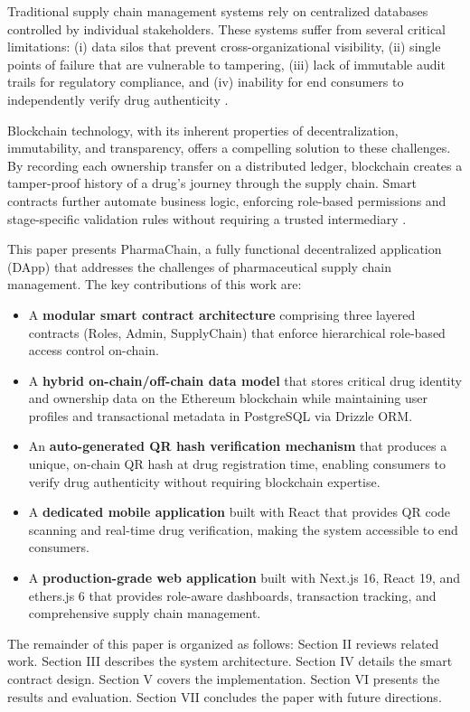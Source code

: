 \documentclass[conference]{IEEEtran}
\begin{document}
Traditional supply chain management systems rely on centralized databases controlled by individual stakeholders. These systems suffer from several critical limitations: (i) data silos that prevent cross-organizational visibility, (ii) single points of failure that are vulnerable to tampering, (iii) lack of immutable audit trails for regulatory compliance, and (iv) inability for end consumers to independently verify drug authenticity \cite{b3}.

Blockchain technology, with its inherent properties of decentralization, immutability, and transparency, offers a compelling solution to these challenges. By recording each ownership transfer on a distributed ledger, blockchain creates a tamper-proof history of a drug's journey through the supply chain. Smart contracts further automate business logic, enforcing role-based permissions and stage-specific validation rules without requiring a trusted intermediary \cite{b4}.

This paper presents PharmaChain, a fully functional decentralized application (DApp) that addresses the challenges of pharmaceutical supply chain management. The key contributions of this work are:

\begin{itemize}
\item A \textbf{modular smart contract architecture} comprising three layered contracts (Roles, Admin, SupplyChain) that enforce hierarchical role-based access control on-chain.
\item A \textbf{hybrid on-chain/off-chain data model} that stores critical drug identity and ownership data on the Ethereum blockchain while maintaining user profiles and transactional metadata in PostgreSQL via Drizzle ORM.
\item An \textbf{auto-generated QR hash verification mechanism} that produces a unique, on-chain QR hash at drug registration time, enabling consumers to verify drug authenticity without requiring blockchain expertise.
\item A \textbf{dedicated mobile application} built with React that provides QR code scanning and real-time drug verification, making the system accessible to end consumers.
\item A \textbf{production-grade web application} built with Next.js 16, React 19, and ethers.js 6 that provides role-aware dashboards, transaction tracking, and comprehensive supply chain management.
\end{itemize}

The remainder of this paper is organized as follows: Section II reviews related work. Section III describes the system architecture. Section IV details the smart contract design. Section V covers the implementation. Section VI presents the results and evaluation. Section VII concludes the paper with future directions.
\end{document}
